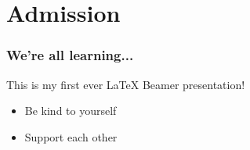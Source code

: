 \documentclass{beamer}
\begin{document}

\section{Admission}


\begin{frame}
    \frametitle{We're all learning...}

    This is my first ever \LaTeX{} Beamer presentation!

    \bigskip

    \begin{itemize}
        \item Be kind to yourself
        \item Support each other
    \end{itemize}


\end{frame}
\end{document}

